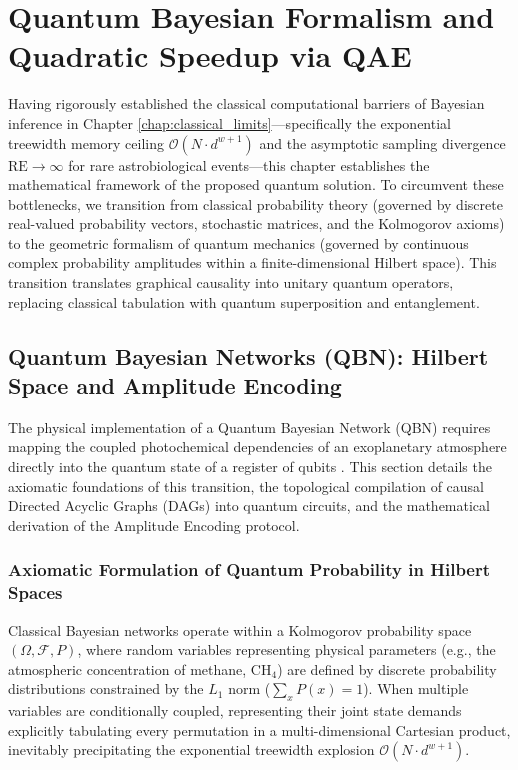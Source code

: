 \chapter{Quantum Bayesian Formalism and Quadratic Speedup via QAE}\label{chap:quantum_bayesian_formalism}

Having rigorously established the classical computational barriers of Bayesian inference in Chapter \ref{chap:classical_limits}---specifically the exponential treewidth memory ceiling $\mathcal{O}(N \cdot d^{w+1})$ and the asymptotic sampling divergence $\mathrm{RE} \to \infty$ for rare astrobiological events---this chapter establishes the mathematical framework of the proposed quantum solution. To circumvent these bottlenecks, we transition from classical probability theory (governed by discrete real-valued probability vectors, stochastic matrices, and the Kolmogorov axioms) to the geometric formalism of quantum mechanics (governed by continuous complex probability amplitudes within a finite-dimensional Hilbert space). This transition translates graphical causality into unitary quantum operators, replacing classical tabulation with quantum superposition and entanglement.

\section{Quantum Bayesian Networks (QBN): Hilbert Space and Amplitude Encoding}\label{sec:qbn_amplitude_encoding}

The physical implementation of a Quantum Bayesian Network (QBN) requires mapping the coupled photochemical dependencies of an exoplanetary atmosphere directly into the quantum state of a register of qubits \cite{low2014}. This section details the axiomatic foundations of this transition, the topological compilation of causal Directed Acyclic Graphs (DAGs) into quantum circuits, and the mathematical derivation of the Amplitude Encoding protocol.

\subsection{Axiomatic Formulation of Quantum Probability in Hilbert Spaces}
Classical Bayesian networks operate within a Kolmogorov probability space $(\Omega, \mathcal{F}, P)$, where random variables representing physical parameters (e.g., the atmospheric concentration of methane, $\mathrm{CH}_4$) are defined by discrete probability distributions constrained by the $L_1$ norm ($\sum_x P(x) = 1$). When multiple variables are conditionally coupled, representing their joint state demands explicitly tabulating every permutation in a multi-dimensional Cartesian product, inevitably precipitating the exponential treewidth explosion $\mathcal{O}(N \cdot d^{w+1})$.

